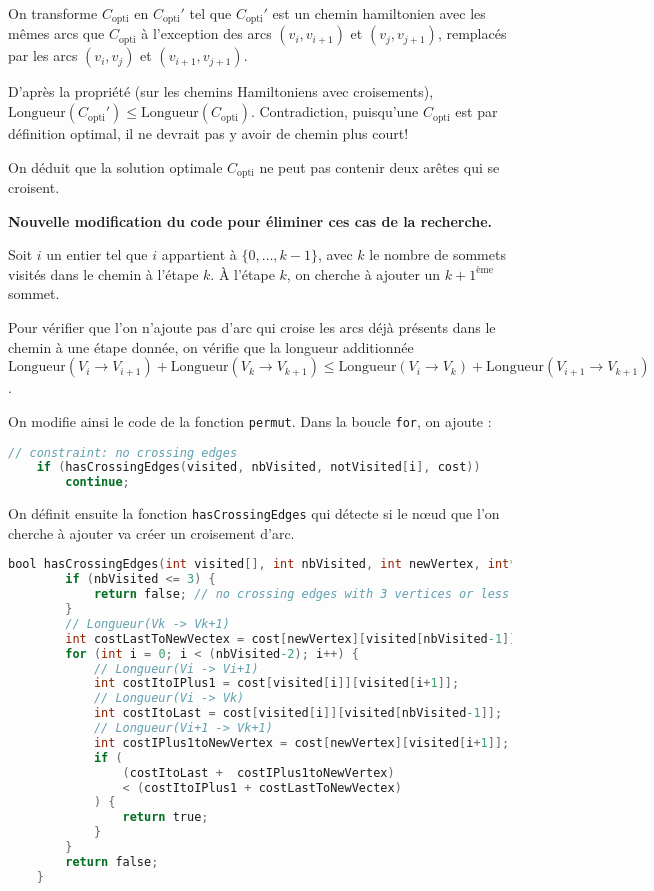 On transforme $C_{\text{opti}}$ en $C_{\text{opti}}'$ tel que $C_{\text{opti}}'$ est un chemin hamiltonien avec les mêmes arcs que $C_{\text{opti}}$ à l'exception des arcs $(v_i, v_{i+1})$ et $(v_j , v_{j+1})$, remplacés par les arcs $(v_i, v_j)$ et $(v_{i+1}, v_{j+1})$.

D'après la propriété (sur les chemins Hamiltoniens avec croisements), $\text{Longueur}(C_{\text{opti}}') \leq \text{Longueur}(C_{\text{opti}})$. Contradiction, puisqu'une $C_{\text{opti}}$ est par définition optimal, il ne devrait pas y avoir de chemin plus court!

On déduit que la solution optimale $C_{\text{opti}}$ ne peut pas contenir deux arêtes qui se croisent.

\textbf{Nouvelle modification du code pour éliminer ces cas de la recherche.}

Soit $i$ un entier tel que $i$ appartient à $\{0, \ldots, k - 1\}$, avec $k$ le nombre de sommets visités dans le chemin à l'étape $k$. À l'étape $k$, on cherche à ajouter un $k+1^{\text{ème}}$ sommet.

Pour vérifier que l'on n'ajoute pas d'arc qui croise les arcs déjà présents dans le chemin à une étape donnée, on vérifie que la longueur additionnée $\text{Longueur}(V_i \rightarrow V_{i+1}) + \text{Longueur}(V_k \rightarrow V_{k+1}) \leq \text{Longueur}(V_i \rightarrow V_k) + \text{Longueur}(V_{i+1} \rightarrow V_{k+1})$.

On modifie ainsi le code de la fonction \texttt{permut}. Dans la boucle \texttt{for}, on ajoute :

\begin{lstlisting}[language=C, caption={Contrainte : pas d'arcs croisés.}]
    // constraint: no crossing edges
    if (hasCrossingEdges(visited, nbVisited, notVisited[i], cost))
        continue;
\end{lstlisting}

On définit ensuite la fonction \texttt{hasCrossingEdges} qui détecte si le nœud que l'on cherche à ajouter va créer un croisement d'arc.

\begin{lstlisting}[language=C, caption={Détection des arcs croisés.}]
    bool hasCrossingEdges(int visited[], int nbVisited, int newVertex, int** cost) {
        if (nbVisited <= 3) {
            return false; // no crossing edges with 3 vertices or less
        }
        // Longueur(Vk -> Vk+1)
        int costLastToNewVectex = cost[newVertex][visited[nbVisited-1]];
        for (int i = 0; i < (nbVisited-2); i++) {
            // Longueur(Vi -> Vi+1)
            int costItoIPlus1 = cost[visited[i]][visited[i+1]];
            // Longueur(Vi -> Vk)
            int costItoLast = cost[visited[i]][visited[nbVisited-1]];
            // Longueur(Vi+1 -> Vk+1)
            int costIPlus1toNewVertex = cost[newVertex][visited[i+1]];
            if (
                (costItoLast +  costIPlus1toNewVertex)
                < (costItoIPlus1 + costLastToNewVectex)
            ) {
                return true;
            }
        }
        return false;
    }
\end{lstlisting}

